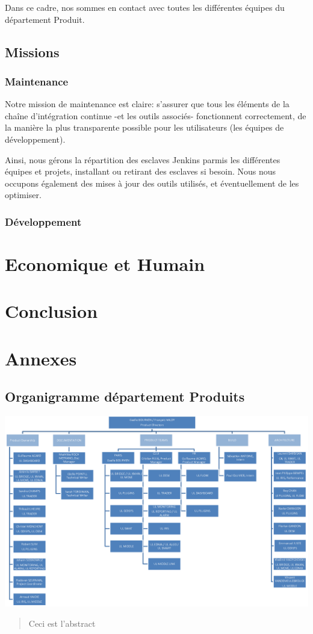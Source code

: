 \documentclass[a4paper, 11pt]{article}
\begin{document}
Dans ce cadre, nos sommes en contact avec toutes les différentes équipes du département Produit.

\subsection{Missions}
\subsubsection{Maintenance}

Notre mission de maintenance est claire: s'assurer que tous les éléments de la chaîne d'intégration continue -et les outils associés- fonctionnent correctement, de la manière la plus transparente possible pour les utilisateurs (les équipes de développement).

Ainsi, nous gérons la répartition des esclaves Jenkins parmis les différentes équipes et projets, installant ou retirant des esclaves si besoin. Nous nous occupons également des mises à jour des outils utilisés, et éventuellement de les optimiser.

\subsubsection{Développement}

\section{Economique et Humain}

\pagebreak
\section*{Conclusion}

\pagebreak
\section*{Annexes}
\subsection*{Organigramme département Produits}
\includegraphics[width=\textheight, angle=90]{dep_product_orga.png}

\pagebreak
\begin{center}
\begin{abstract}
Ceci est l'abstract
\end{abstract}
\end{center}
\end{document}

